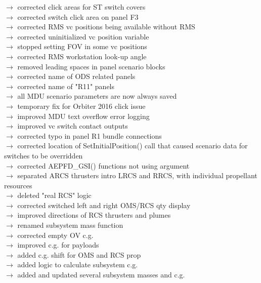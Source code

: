 \documentclass[Space_Shuttle_Vessel_Manual.tex]{subfiles}
\begin{document}
$\rightarrow$ corrected click areas for ST switch covers\\
$\rightarrow$ corrected switch click area on panel F3\\
$\rightarrow$ corrected RMS vc positions being available without RMS\\
$\rightarrow$ corrected uninitialized vc position variable\\
$\rightarrow$ stopped setting FOV in some vc positions\\
$\rightarrow$ corrected RMS workstation look-up angle\\
$\rightarrow$ removed leading spaces in panel scenario blocks\\
$\rightarrow$ corrected name of ODS related panels\\
$\rightarrow$ corrected name of "R11" panels\\
$\rightarrow$ all MDU scenario parameters are now always saved\\
$\rightarrow$ temporary fix for Orbiter 2016 click issue\\
$\rightarrow$ improved MDU text overflow error logging\\
$\rightarrow$ improved vc switch contact outputs\\
$\rightarrow$ corrected typo in panel R1 bundle connections\\
$\rightarrow$ corrected location of SetInitialPosition() call that caused scenario data for switches to be overridden\\
$\rightarrow$ corrected AEPFD\_GSI() functions not using argument\\
$\rightarrow$ separated ARCS thrusters intro LRCS and RRCS, with individual propellant resources\\
$\rightarrow$ deleted "real RCS" logic\\
$\rightarrow$ corrected switched left and right OMS/RCS qty display\\
$\rightarrow$ improved directions of RCS thrusters and plumes\\
$\rightarrow$ renamed subsystem mass function\\
$\rightarrow$ corrected empty OV c.g.\\
$\rightarrow$ improved c.g. for payloads\\
$\rightarrow$ added c.g. shift for OMS and RCS prop\\
$\rightarrow$ added logic to calculate subsystem c.g.\\
$\rightarrow$ added and updated several subsystem masses and c.g.\\
\end{document}
